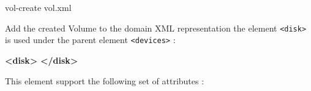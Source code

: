 \documentclass[
  14pt,
  english,
  a4paper,
]{scrreprt}
\newenvironment{Shaded}{}{}
\newcommand{\ExtensionTok}[1]{#1}
\newcommand{\KeywordTok}[1]{\textcolor[rgb]{0.00,0.44,0.13}{\textbf{#1}}}
\newcommand{\NormalTok}[1]{#1}
\begin{document}
\begin{Shaded}
\begin{Highlighting}[]
\ExtensionTok{vol{-}create}\NormalTok{ vol.xml}
\end{Highlighting}
\end{Shaded}

Add the created Volume to the domain XML representation the element
\texttt{\textless{}disk\textgreater{}} is used under the parent element
\texttt{\textless{}devices\textgreater{}} :

\begin{Shaded}
\begin{Highlighting}[]
\KeywordTok{\textless{}disk\textgreater{}}
\KeywordTok{\textless{}/disk\textgreater{}}
\end{Highlighting}
\end{Shaded}

This element support the following set of attributes :
\end{document}
